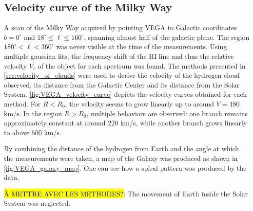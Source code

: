 \subsection{Velocity curve of the Milky Way}
A scan of the Milky Way acquired by pointing VEGA to Galactic coordinates $b = 0^\circ$ and $18^\circ \leq \ell \leq 160^\circ$, spanning almost half of the galactic plane. The region $180^\circ < \ell < 360^\circ$ was never visible at the time of the measurements.
Using multiple gaussian fits, the frequency shift of the HI line and thus the relative velocity $V_r$ of the object for each spectrum was found. The methods presented in \autoref{sec:velocity_of_clouds} were used to derive the velocity of the hydrogen cloud observed, its distance from the Galactic Center and its distance from the Solar System.
\autoref{fig:VEGA_velocity_curve} depicts the velocity curves obtained for each method. For $R < R_0$, the velocity seems to grow linearly up to around $V=180$ km/s. In the region $R > R_0$, multiple behaviors are observed: one branch remains approximately constant at around $220$ km/s, while another branch grows linearly to above $500$ km/s.

By combining the distance of the hydrogen from Earth and the angle at which the measurements were taken, a map of the Galaxy was produced as shown in \autoref{fig:VEGA_galaxy_map}. One can see how a spiral pattern was produced by the data.

\hl{À METTRE AVEC LES METHODES?}: The movement of Earth inside the Solar System was neglected.

